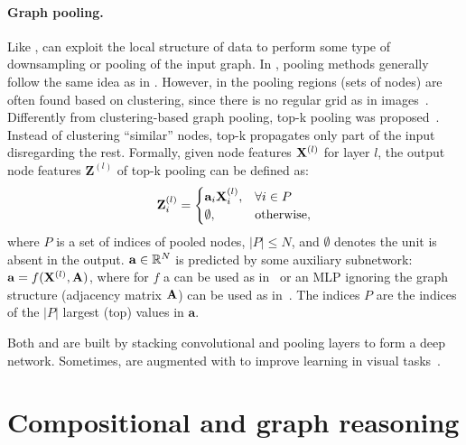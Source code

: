 \paragraph{Graph pooling.} Like \cnns, \gnns can exploit the local structure of data to perform some type of downsampling or pooling of the input graph.
In \gnns, pooling methods generally follow the same idea as in \cnns. However, in \gnns the pooling regions (sets of nodes) are often found based on clustering, since there is no regular grid as in images~\citep{defferrard2016convolutional,shaham2018spectralnet,ying2018hierarchical}.
Differently from clustering-based graph pooling, top-k pooling was proposed~\citep{graphunet2018}. Instead of clustering ``similar'' nodes, top-k propagates only part of the input disregarding the rest.
Formally, given node features $\mathbf{X}^{(l)}$ for layer $l$, the output node features $\mathbf{Z}^{(l)}$ of top-k pooling can be defined as:
%
\begin{equation}
\mathbf{Z}^{(l)}_i =
\begin{cases}
\mathbf{a}_i \mathbf{X}^{(l)}_i,& \forall i \in P\\
\emptyset, & \text{otherwise} ,
\end{cases}
\end{equation}
%
where $P$ is a set of indices of pooled nodes, $|P| \leq N$, and $\emptyset$ denotes the unit is absent in the output. $\mathbf{a} \in \mathbb{R}^N$ is predicted by some auxiliary subnetwork: $\mathbf{a}=f(\mathbf{X}^{(l)}, \mathbf{A})$, where for $f$ a \gnn can be used as in~\citep{lee2019self} or an MLP ignoring the graph structure (adjacency matrix $\mathbf{A}$) can be used as in~\citep{graphunet2018}.
The indices $P$ are the indices of the $|P|$ largest (top) values in $\mathbf{a}$.

Both \gnns and \cnns are built by stacking convolutional and pooling layers to form a deep network. Sometimes, \cnns are augmented with \gnns to improve learning in visual tasks~\citep{li2018beyond,liu2020non}.

\section{Compositional and graph reasoning\label{sec:bg_comp}}

